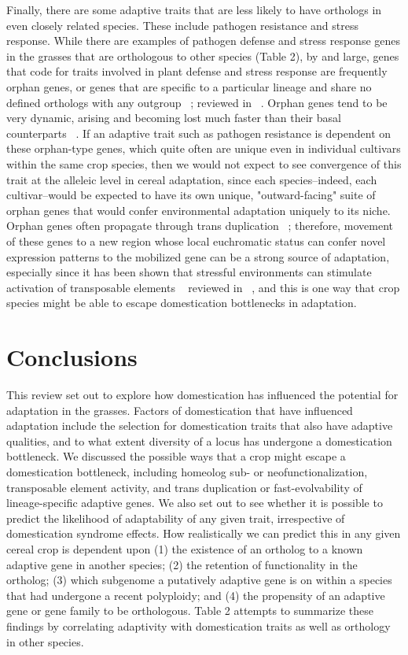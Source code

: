 \documentclass[12pt]{article}
\begin{document}
Finally, there are some adaptive traits that are less likely to have orthologs in even closely related species. These include pathogen resistance and stress response. While there are examples of pathogen defense and stress response genes in the grasses that are orthologous to other species (Table 2), by and large, genes that code for traits involved in plant defense and stress response are frequently orphan genes, or genes that are specific to a particular lineage and share no defined orthologs with any outgroup ~\citep{Woodhouse2011}; reviewed in ~\citep{Arendsee2014}. Orphan genes tend to be very dynamic, arising and becoming lost much faster than their basal counterparts ~\citep{Freeling2008}.  If an adaptive trait such as pathogen resistance is dependent on these orphan-type genes, which quite often are unique even in individual cultivars within the same crop species, then we would not expect to see convergence of this trait at the alleleic level in cereal adaptation, since each species--indeed, each cultivar--would be expected to have its own unique, "outward-facing" suite of orphan genes that would confer environmental adaptation uniquely to its niche. Orphan genes often propagate through trans duplication ~\citep{Freeling2008, Arendsee2014}; therefore, movement of these genes to a new region whose local euchromatic status can confer novel expression patterns to the mobilized gene can be a strong source of adaptation, especially since it has been shown that stressful environments can stimulate activation of transposable elements ~\citep{Beguiristain2001, Makarevitch2015}  reviewed in ~\citep{Negi2016}, and this is one way that crop species might be able to escape domestication bottlenecks in adaptation.

\section*{Conclusions}
This review set out to explore how domestication has influenced the potential for adaptation in the grasses.  Factors of domestication that have influenced adaptation include the selection for domestication traits that also have adaptive qualities, and to what extent diversity of a locus has undergone a domestication bottleneck. We discussed the possible ways that a crop might escape a domestication bottleneck, including homeolog sub- or neofunctionalization, transposable element activity, and trans duplication or fast-evolvability of lineage-specific adaptive genes. We also set out to see whether it is possible to predict the likelihood of adaptability of any given trait, irrespective of domestication syndrome effects. How realistically we can predict this in any given cereal crop is dependent upon  (1) the existence of an ortholog to a known adaptive gene in another species; (2) the retention of functionality in the ortholog; (3)  which subgenome a putatively adaptive gene is on within a species that had undergone a recent polyploidy; and (4) the propensity of an adaptive gene or gene family to be orthologous.   Table 2 attempts to summarize these findings by correlating adaptivity with domestication traits as well as orthology in other species.  




\end{document}
